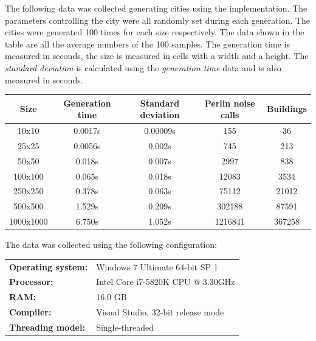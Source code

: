 	The following data was collected generating cities using the implementation. The parameters controlling the city were all randomly set during each generation. The cities were generated 100 times for each size respectively. The data shown in the table are all the average numbers of the 100 samples. The generation time is measured in seconds, the size is measured in cells with a width and a height.
	The \textit{standard deviation} is calculated using the \textit{generation time} data and is also measured in seconds.
	
	\begin{center}
		\begin{tabular}{|c | c c c c|} 
			\hline
			Size & Generation time & Standard deviation & Perlin noise calls & Buildings \\ [0.9ex] 
			\hline\hline
			10x10 & 0.0017s & 0.00009s & 155 & 36 \\ 
			\hline
			25x25 & 0.0056s & 0.002s & 745 & 213 \\
			\hline
			50x50 & 0.018s & 0.007s & 2997 & 838 \\
			\hline
			100x100 & 0.065s & 0.018s & 12083 & 3534 \\
			\hline
			250x250 & 0.378s & 0.063s & 75112 & 21012 \\
			\hline
			500x500 & 1.529s & 0.209s & 302188 & 87591 \\
			\hline
			1000x1000 & 6.750s & 1.052s & 1216841 & 367258 \\ [2ex] 
			\hline
		\end{tabular}
	\end{center}
	
	\begin{flushleft}
	The data was collected using the following configuration: \\
	\end{flushleft}
	\begin{tabular}{l l}
		\textbf{Operating system:} & Windows 7 Ultimate 64-bit SP 1 \\
		\textbf{Processor:} & Intel Core i7-5820K CPU @ 3.30GHz \\
		\textbf{RAM:} & 16,0 GB \\
		\textbf{Compiler:} & Visual Studio, 32-bit release mode \\
		\textbf{Threading model:} & Single-threaded \\
	\end{tabular}
	
